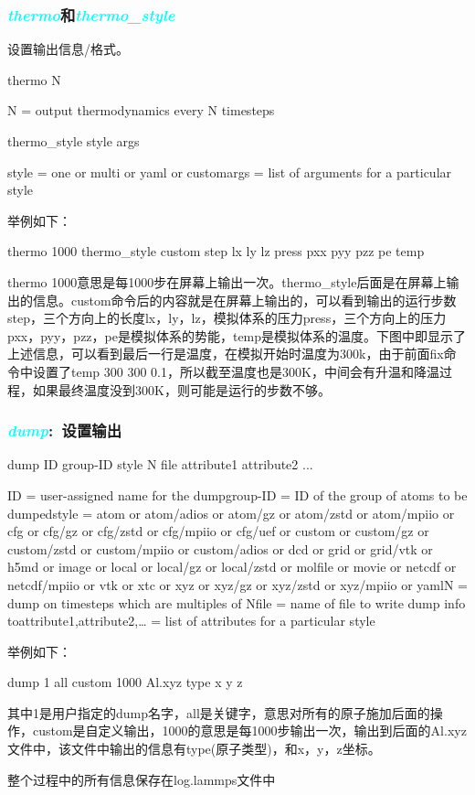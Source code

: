 \frame
{
	\frametitle{\textcolor{cyan}{\textit{thermo}}和\textcolor{cyan}{\textit{thermo\_style}}}
	设置输出信息/格式。

thermo N

    N = output thermodynamics every N timesteps

thermo_style style args

    style = one or multi or yaml or customargs = list of arguments for a particular style

举例如下：

thermo 1000
thermo_style custom step lx ly lz press pxx pyy pzz pe temp

thermo 1000意思是每1000步在屏幕上输出一次。thermo_style后面是在屏幕上输出的信息。custom命令后的内容就是在屏幕上输出的，可以看到输出的运行步数step，三个方向上的长度lx，ly，lz，模拟体系的压力press，三个方向上的压力pxx，pyy，pzz，pe是模拟体系的势能，temp是模拟体系的温度。下图中即显示了上述信息，可以看到最后一行是温度，在模拟开始时温度为300k，由于前面fix命令中设置了temp 300 300 0.1，所以截至温度也是300K，中间会有升温和降温过程，如果最终温度没到300K，则可能是运行的步数不够。
}


\frame
{
	\frametitle{\textcolor{cyan}{\textit{dump}}:~设置输出}
	dump ID group-ID style N file attribute1 attribute2 ...

    ID = user-assigned name for the dumpgroup-ID = ID of the group of atoms to be dumpedstyle = atom or atom/adios or atom/gz or atom/zstd or atom/mpiio or cfg or cfg/gz or cfg/zstd or cfg/mpiio or cfg/uef or custom or custom/gz or custom/zstd or custom/mpiio or custom/adios or dcd or grid or grid/vtk or h5md or image or local or local/gz or local/zstd or molfile or movie or netcdf or netcdf/mpiio or vtk or xtc or xyz or xyz/gz or xyz/zstd or xyz/mpiio or yamlN = dump on timesteps which are multiples of Nfile = name of file to write dump info toattribute1,attribute2,… = list of attributes for a particular style

举例如下：

dump 1 all custom 1000 Al.xyz type x y z

其中1是用户指定的dump名字，all是关键字，意思对所有的原子施加后面的操作，custom是自定义输出，1000的意思是每1000步输出一次，输出到后面的Al.xyz文件中，该文件中输出的信息有type(原子类型)，和x，y，z坐标。

整个过程中的所有信息保存在log.lammps文件中
}

